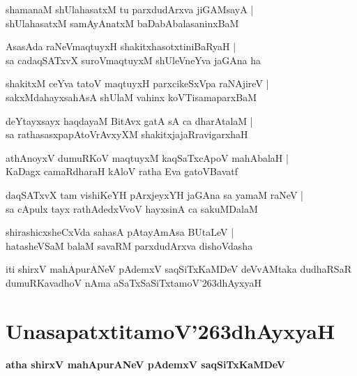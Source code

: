 \documentclass[twoside,12pt,openright]{book}
\def\S{\char'263}
\newcounter{shloka}[chapter]
\begin{document}
\begin{shloka}%
shamanaM shUlahasatxM tu parxdudArxva jiGAMsayA |\\
shUlahasatxM samAyAnatxM baDabAbalasaninxBaM 
\end{shloka}

\begin{shloka}%
AsasAda raNeVmaqtuyxH shakitxhasotxtiniBaRyaH |\\
sa cadaqSATxvX suroVmaqtuyxM shUleVneYva jaGAna ha 
\end{shloka}

\begin{shloka}%
shakitxM ceYva tatoV maqtuyxH parxcikeSxVpa raNAjireV |\\
sakxMdahayxsahAsA shUlaM vahinx koVTisamaparxBaM 
\end{shloka}

\begin{shloka}%
deYtayxsayx haqdayaM BitAvx gatA sA ca dharAtalaM |\\
sa rathasasxpapAtoVrAvxyXM shakitxjajaRravigarxhaH
\end{shloka}

\begin{shloka}%
athAnoyxV dumuRKoV maqtuyxM kaqSaTxcApoV mahAbalaH |\\
KaDagx camaRdharaH kAloV ratha Eva gatoVBavatf
\end{shloka}

\begin{shloka}%
daqSATxvX tam vishiKeYH pArxjeyxYH jaGAna sa yamaM raNeV |\\
sa cApulx tayx rathAdedxVvoV hayxsinA ca sakuMDalaM
\end{shloka}

\begin{shloka}%
shirashicxsheCxVda sahasA pAtayAmAsa BUtaLeV |\\
hatasheVSaM balaM savaRM parxdudArxva dishoVdasha
\end{shloka}

\begin{center}
iti shirxV mahApurANeV pAdemxV saqSiTxKaMDeV deVvAMtaka dudhaRSaR dumuRKavadhoV nAma 
aSaTxSaSiTxtamoV\S dhAyxyaH
\end{center}

\chapter{UnasapatxtitamoV\S dhAyxyaH}

\begin{center}
{\LARGE\bfseries atha shirxV mahApurANeV pAdemxV saqSiTxKaMDeV}
\end{center}
\end{document}
